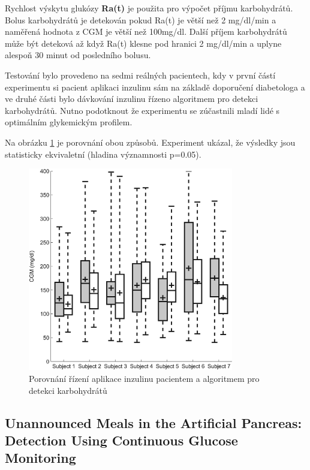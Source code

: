 Rychlost výskytu glukózy \textbf{Ra(t)} je použita pro výpočet příjmu karbohydrátů. Bolus karbohydrátů je detekován pokud Ra(t) je větší než 2 mg/dl/min a naměřená hodnota z CGM je větší než 100mg/dl. Další příjem karbohydrátů může být deteková až když Ra(t) klesne pod hranici 2 mg/dl/min a uplyne alespoň 30 minut od posledního bolusu.

Testování bylo provedeno na sedmi reálných pacientech, kdy v první částí experimentu si pacient aplikaci inzulinu sám na základě doporučení diabetologa a ve druhé části bylo dávkování inzulinu řízeno algoritmem pro detekci karbohydrátů. Nutno podotknout že experimentu se zúčastnili mladí lidé s optimálním glykemickým profilem.

Na obrázku \ref{fig:turksoy2} je porovnání obou způsobů. Experiment ukázal, že výsledky jsou statisticky ekvivaletní (hladina významnosti p=0.05).

\begin{figure}[H]
\caption{Porovnání řízení aplikace inzulinu pacientem a algoritmem pro detekci karbohydrátů}
\label{fig:turksoy2}
\centering
\includegraphics[width=0.8\textwidth]{img/analyza/turksoy3.jpg}
\end{figure}


\subsection{Unannounced Meals in the Artificial Pancreas: Detection Using Continuous Glucose Monitoring \citep{Analyza.CrossCovariance}}
\label{ch:CrossCovariance}

